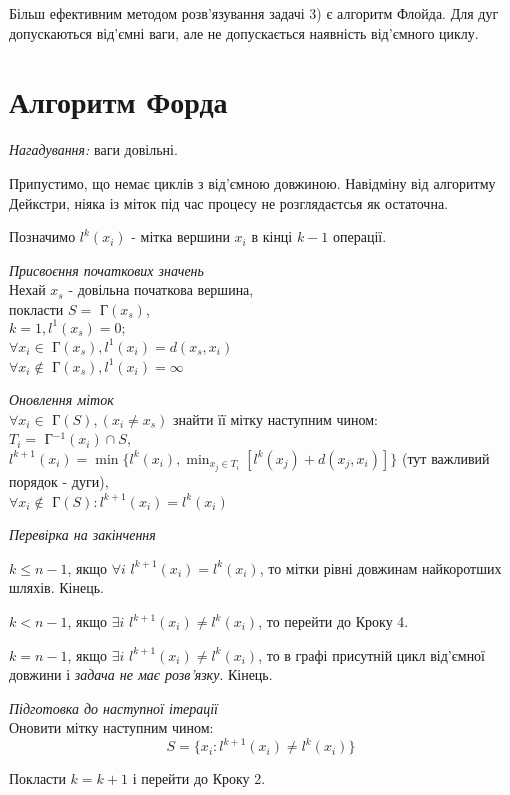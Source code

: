 \documentclass[12pt,a4paper]{book}
\newenvironment{slim_enumerate}{
\begin{enumerate}
  \setlength{\itemsep}{1pt}
  \setlength{\parskip}{0pt}
  \setlength{\parsep}{0pt}}
{\end{enumerate}}
\begin{document}
Більш ефективним методом розв’язування задачі 3) є алгоритм Флойда. Для дуг допускаються від’ємні ваги, але не допускається наявність від’ємного циклу.

\section{Алгоритм Форда}

\emph{Нагадування:} ваги довільні.

Припустимо, що немає циклів з від’ємною довжиною. Навідміну від алгоритму Дейкстри, ніяка із міток під час процесу не розглядаєтсья як остаточна.

Позначимо $l^k(x_i)$ - мітка вершини $x_i$ в кінці $k-1$ операції.
\begin{slim_enumerate}
  \item \emph{Присвоєння початкових значень}\\
Нехай $x_s$ - довільна початкова вершина,\\
покласти $S=$ Г$(x_s)$,\\
$k=1, l^1(x_s)=0;$\\
$\forall x_i \in$ Г$(x_s), l^1(x_i)=d(x_s,x_i)$\\
$\forall x_i \notin$ Г$(x_s), l^1(x_i)=\infty$
  \item \emph{Оновлення міток}\\
$\forall x_i \in$ Г$(S), (x_i \neq x_s)$ знайти її мітку наступним чином:\\
$T_i=$ Г$^{-1}(x_i) \cap S$,\\
$l^{k+1}(x_i)=\min\{l^k(x_i),\displaystyle\min_{x_j \in T_i}[l^k(x_j)+d(x_j,x_i)]\}$ (тут важливий порядок - дуги),\\
$\forall x_i \notin$ Г$(S): l^{k+1}(x_i)=l^k(x_i)$
  \item \emph{Перевірка на закінчення}
    \begin{slim_enumerate}
      \item $k \le n-1$, якщо $\forall i$ $l^{k+1}(x_i)=l^k(x_i)$, то мітки рівні довжинам найкоротших шляхів. Кінець.
      \item $k<n-1$, якщо $\exists i$ $l^{k+1}(x_i) \neq l^k(x_i)$, то перейти до Кроку 4.
      \item $k=n-1$, якщо $\exists i$ $l^{k+1}(x_i) \neq l^k(x_i)$, то в графі присутній цикл від’ємної довжини і \emph{задача не має розв’язку}. Кінець.
    \end{slim_enumerate}
  \item \emph{Підготовка до наступної ітерації}\\
Оновити мітку наступним чином:
$$S=\{x_i:l^{k+1}(x_i) \neq l^k(x_i)\}$$
  \item Покласти $k=k+1$ і перейти до Кроку 2.
\end{slim_enumerate}
\end{document}
